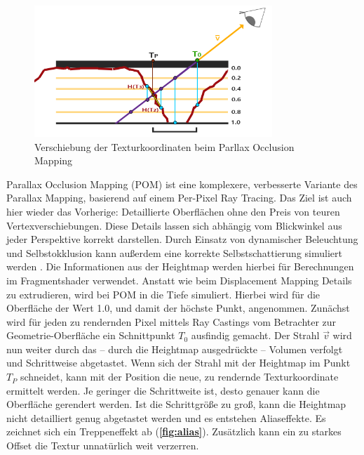 \begin{figure}[h]
	\centering
	\includegraphics[width=0.8\textwidth]{Grafiken/Basics/Mapping/Infografik_POM.png}
	\begin{footnotesize}
		\caption{Verschiebung der Texturkoordinaten beim Parllax Occlusion Mapping}
	\end{footnotesize}
\end{figure}


Parallax Occlusion Mapping (POM) ist eine komplexere, verbesserte Variante des Parallax Mapping, basierend auf einem Per-Pixel Ray Tracing.
Das Ziel ist auch hier wieder das Vorherige: Detaillierte Oberflächen ohne den Preis von teuren Vertexverschiebungen.
Diese Details lassen sich abhängig vom Blickwinkel aus jeder Perspektive korrekt darstellen.
Durch Einsatz von dynamischer Beleuchtung und Selbstokklusion kann außerdem eine korrekte Selbstschattierung simuliert werden \parencite{Brawley2004, Tatarchuk2006}.
Die Informationen aus der Heightmap werden hierbei für Berechnungen im Fragmentshader verwendet.
Anstatt wie beim Displacement Mapping Details zu extrudieren, wird bei POM in die Tiefe simuliert.
Hierbei wird für die Oberfläche der Wert 1.0, und damit der höchste Punkt, angenommen.
Zunächst wird für jeden zu rendernden Pixel mittels Ray Castings vom Betrachter zur Geometrie-Oberfläche ein Schnittpunkt  $T_0$ ausfindig gemacht.
Der Strahl $\vec{v}$ wird nun weiter durch das – durch die Heightmap ausgedrückte – Volumen verfolgt und Schrittweise abgetastet. Wenn sich der Strahl 
mit der Heightmap im Punkt $T_P$ schneidet, kann mit der Position die neue, zu rendernde Texturkoordinate ermittelt werden. 
Je geringer die Schrittweite ist, desto genauer kann die Oberfläche gerendert werden.
Ist die Schrittgröße zu groß, kann die Heightmap nicht detailliert genug abgetastet werden und es entstehen Aliaseffekte. Es zeichnet sich
ein Treppeneffekt ab (\textbf{\autoref{fig:alias}}). Zusätzlich kann ein zu starkes Offset die Textur unnatürlich weit verzerren. 


